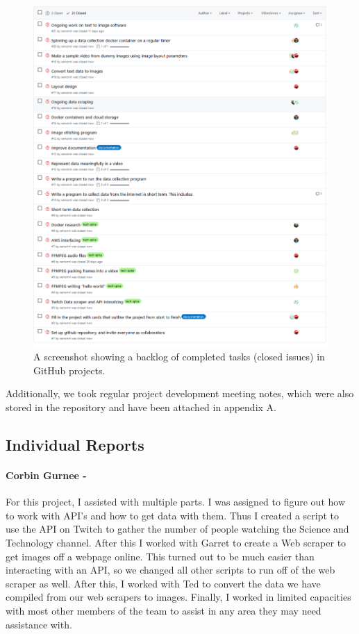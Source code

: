 \documentclass{article}
\begin{document}
  \begin{figure}[h!]
    \centering
    \includegraphics[width=\linewidth]{img/task_backlog.png}
    \caption{A screenshot showing a backlog of completed tasks (closed issues) in GitHub projects.}
    \label{backlog}
  \end{figure}
  Additionally, we took regular project development meeting notes, which were also stored in the repository and have been attached in appendix A.
  \newpage
  \subsection{Individual Reports}
    \paragraph{Corbin Gurnee -}
    For this project, I assisted with multiple parts. I was assigned to figure out how to work with API’s and how to get data with them. Thus I created a script to use the API on Twitch to gather the number of people watching the Science and Technology channel. After this I worked with Garret to create a Web scraper to get images off a webpage online. This turned out to be much easier than interacting with an API, so we changed all other scripts to run off of the web scraper as well. After this, I worked with Ted to convert the data we have compiled from our web scrapers to images. Finally, I worked in limited capacities with most other members of the team to assist in any area they may need assistance with.
\end{document}
